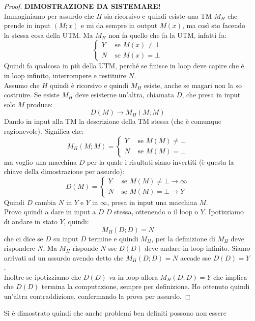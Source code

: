 \begin{proof}
  \textbf{DIMOSTRAZIONE DA SISTEMARE!}\\
  Immaginiamo per assurdo che $H$ sia ricorsivo e quindi esiste una TM $M_H$ che
  prende in input $(M;x)$ e mi da sempre in output $M(x)$, ma così sto facendo
  la stessa cosa della UTM. Ma $M_H$ non fa quello che fa la UTM, infatti fa:
  \[
    \begin{cases}
      Y& \mbox{ se }M(x)\neq \bot\\
      N& \mbox{ se }M(x) = \bot
    \end{cases}
  \]
  Quindi fa qualcosa in più della UTM, perché se finisce in loop deve capire che
  è in loop infinito, interrompere e restituire $N$.\\
  Assumo che $H$ quindi è ricorsivo e quindi $M_H$ esiste, anche se magari non
  la so costruire. Se esiste $M_H$ deve esisterne un'altra, chiamata $D$, che
  presa in input solo $M$ produce:
  \[D(M)\to M_H(M;M)\]
  Dando in input alla TM la descrizione della TM stessa (che è comunque
  ragionevole). Significa che:
  \[M_H(M;M)=
    \begin{cases}
      Y& \mbox{ se }M(M)\neq \bot\\
      N& \mbox{ se }M(M)=\bot
    \end{cases}
  \]
  ma voglio una macchina $D$ per la quale i risultati siano invertiti (è questa
  la chiave della dimostrazione per assurdo):
  \[D(M)=
    \begin{cases}
      Y& \mbox{ se }M(M)\neq \bot\to\infty\\
      N& \mbox{ se }M(M)=\bot\to Y
    \end{cases}
  \]
  Quindi $D$ cambia $N$ in $Y$ e $Y$ in $\infty$, presa in input una macchina
  $M$.\\
  Provo quindi a dare in input a $D$ $D$ stessa, ottenendo o il loop o
  $Y$. Ipotizziamo di andare in stato $Y$, quindi:
  \[M_H(D;D)=N\]
  che ci dice se $D$ su input $D$ termine e quindi $M_H$, per la definizione di
  $M_H$ deve rispondere $N$, Ma $M_H$ risponde $N$ sse $D(D)$ deve andare in
  loop infinito. Siamo arrivati ad un assurdo avendo detto che $M_H(D;D)=N$
  accade sse $D(D)=Y$. \\
  Inoltre se ipotizziamo che $D(D)$ va in loop allora $M_H(D;D)=Y$ che implica
  che $D(D)$ termina la computazione, sempre per definizione. Ho ottenuto quindi
  un'altra contraddizione, confermando la prova per assurdo.
\end{proof}
Si è dimostrato quindi che anche problemi ben definiti possono non essere
